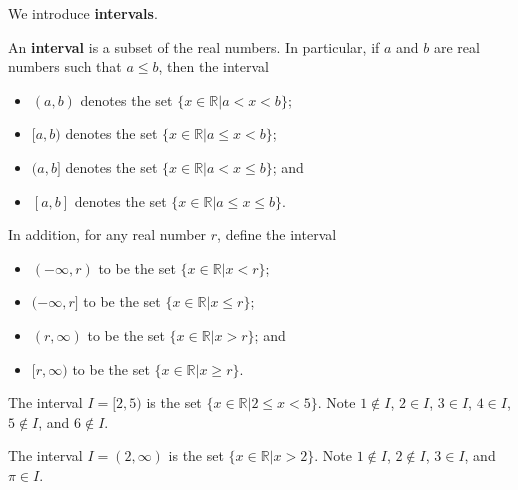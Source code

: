 We introduce \textbf{intervals}.
\begin{definition}
    An \textbf{interval} is a subset of the real numbers. In particular, if $a$ and $b$ are real numbers such that $a \leq b$, then the interval
    \begin{itemize}
        \item $(a,b)$ denotes the set $\{x \in \mathbb{R} \vert a < x < b\}$;
        \item $[a,b)$ denotes the set $\{x \in \mathbb{R} \vert a \leq x < b\}$;
        \item $(a,b]$ denotes the set $\{x \in \mathbb{R} \vert a < x \leq b\}$; and
        \item $[a,b]$ denotes the set $\{x \in \mathbb{R} \vert a \leq x \leq b\}$.
    \end{itemize}
    In addition, for any real number $r$, define the interval
    \begin{itemize}
        \item $(-\infty,r)$ to be the set $\{x \in \mathbb{R} \vert x < r\}$;
        \item $(-\infty,r]$ to be the set $\{x \in \mathbb{R} \vert x \leq r\}$;
        \item $(r, \infty)$ to be the set $\{x \in \mathbb{R} \vert x > r\}$; and
        \item $[r, \infty)$ to be the set $\{x \in \mathbb{R} \vert x \geq r\}$.
    \end{itemize}
\end{definition}
\begin{example}
    The interval $I = [2, 5)$ is the set $\{x \in \mathbb{R} \vert 2 \leq x < 5\}$. Note $1 \notin I$, $2 \in I$, $3 \in I$, $4 \in I$, $5 \notin I$, and $6 \notin I$.
\end{example}
\begin{example}
    The interval $I = (2, \infty)$ is the set $\{x \in \mathbb{R} \vert x > 2\}$. Note $1 \notin I$, $2 \notin I$, $3 \in I$, and $\pi \in I$.
\end{example}

